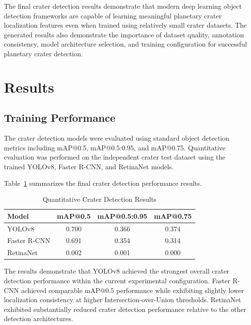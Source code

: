 \documentclass[conference]{IEEEtran}
\begin{document}
	The final crater detection results demonstrate that modern deep learning object detection frameworks are capable of learning meaningful planetary crater localization features even when trained using relatively small crater datasets. The generated results also demonstrate the importance of dataset quality, annotation consistency, model architecture selection, and training configuration for successful planetary crater detection.
	
	\section{Results}
	
	\subsection{Training Performance}
	
	The crater detection models were evaluated using standard object detection metrics including mAP@0.5, mAP@0.5:0.95, and mAP@0.75. Quantitative evaluation was performed on the independent crater test dataset using the trained YOLOv8, Faster R-CNN, and RetinaNet models.
	
	Table~\ref{tab:quantitative_results} summarizes the final crater detection performance results.
	
	\begin{table}[h]
		\centering
		\caption{Quantitative Crater Detection Results}
		\label{tab:quantitative_results}
		
		\begin{tabular}{lccc}
			\toprule
			Model & mAP@0.5 & mAP@0.5:0.95 & mAP@0.75 \\
			\midrule
			YOLOv8 & 0.700 & 0.366 & 0.374 \\
			Faster R-CNN & 0.691 & 0.354 & 0.314 \\
			RetinaNet & 0.002 & 0.001 & 0.000 \\
			\bottomrule
		\end{tabular}
		
	\end{table}
	
	The results demonstrate that YOLOv8 achieved the strongest overall crater detection performance within the current experimental configuration. Faster R-CNN achieved comparable mAP@0.5 performance while exhibiting slightly lower localization consistency at higher Intersection-over-Union thresholds. RetinaNet exhibited substantially reduced crater detection performance relative to the other detection architectures.
	
\end{document}
